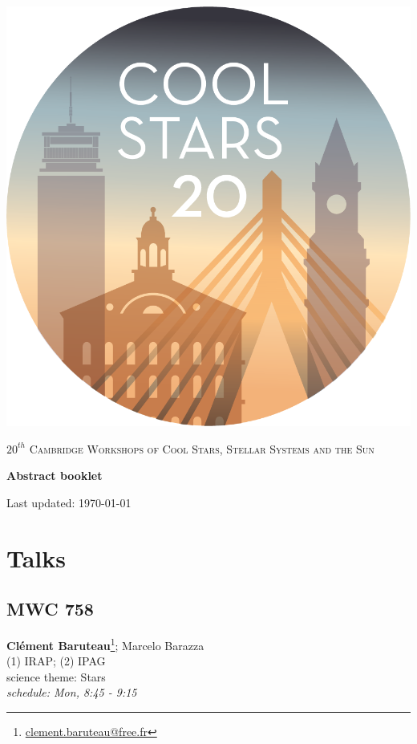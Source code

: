 \documentclass[11pt,twoside, openright]{report}
\begin{document}
\begin{titlepage}
  \centering
  \includegraphics[width=.6\textwidth]{Logoround-04}
  \vspace{2cm}
  \par{\scshape\LARGE $20^{th}$ Cambridge Workshops of Cool Stars, Stellar Systems and the Sun \par}
  \vspace{1cm}{\scshape\Large July 29 - Aug 3 2018, Boston / Cambridge, USA \par}
  \vspace{1.5cm}
  {\huge\bfseries Abstract booklet\par}
  \vfill

  {\large Last updated: \today\par}
\end{titlepage}

\tableofcontents

\chapter{Talks}
        
          \section[Clément Baruteau: MWC 758] { MWC 758 }
\textbf{ Clément Baruteau}\footnote{\href{mailto: clement.baruteau@free.fr}{clement.baruteau@free.fr} };  Marcelo Barazza\\
    (1) IRAP; (2)  IPAG\\


    
    \noindent
    science theme: Stars\\
    \emph{schedule: Mon, 8:45 - 9:15  }\\
\end{document}
